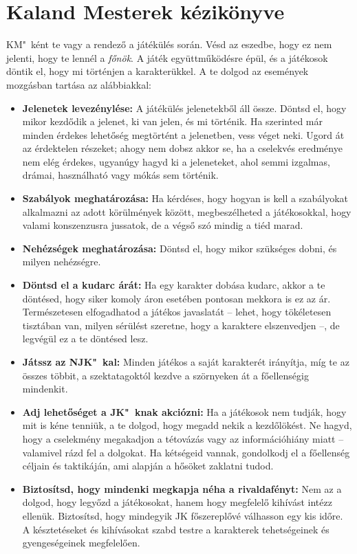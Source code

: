 \chapter{Kaland Mesterek kézikönyve}

KM"~ként te vagy a rendező a játékülés során. Vésd az eszedbe, hogy ez nem jelenti, hogy te lennél a \emph{főnök}. A  játék együttműködésre épül, és a játékosok döntik el, hogy mi történjen a karakterükkel. A te dolgod az események mozgásban tartása az alábbiakkal:

\begin{itemize}
    \item \textbf{Jelenetek levezénylése:} A játékülés jelenetekből áll össze. Döntsd el, hogy mikor kezdődik a jelenet, ki van jelen, és mi történik. Ha szerinted már minden érdekes lehetőség megtörtént a jelenetben, vess véget neki. Ugord át az érdektelen részeket; ahogy nem dobsz akkor se, ha a cselekvés eredménye nem elég érdekes, ugyanúgy hagyd ki a jeleneteket, ahol semmi izgalmas, drámai, használható vagy mókás sem történik.
    \item \textbf{Szabályok meghatározása:} Ha kérdéses, hogy hogyan is kell a szabályokat alkalmazni az adott körülmények között, megbeszélheted a játékosokkal, hogy valami konszenzusra jussatok, de a végső szó mindig a tiéd marad.
    \item \textbf{Nehézségek meghatározása:} Döntsd el, hogy mikor szükséges dobni, és milyen nehézségre.
    \item \textbf{Döntsd el a kudarc árát:} Ha egy karakter dobása kudarc, akkor a te döntésed, hogy siker komoly áron esetében pontosan mekkora is ez az ár. Természetesen elfogadhatod a játékos javaslatát – lehet, hogy tökéletesen tisztában van, milyen sérülést szeretne, hogy a karaktere elszenvedjen –, de legvégül ez a te döntésed lesz.
    \item \textbf{Játssz az NJK"~kal:} Minden játékos a saját karakterét irányítja, míg te az összes többit, a szektatagoktól kezdve a szörnyeken át a főellenségig mindenkit.
    \item \textbf{Adj lehetőséget a JK"~knak akciózni:} Ha a játékosok nem tudják, hogy mit is kéne tenniük, a te dolgod, hogy megadd nekik a kezdőlökést. Ne hagyd, hogy a cselekmény megakadjon a tétovázás vagy az információhiány miatt – valamivel rázd fel a dolgokat. Ha kétségeid vannak, gondolkodj el a főellenség  céljain és taktikáján, ami alapján a hősöket zaklatni tudod.
    \item \textbf{Biztosítsd, hogy mindenki megkapja néha a rivaldafényt:} Nem az a dolgod, hogy legyőzd a játékosokat, hanem hogy megfelelő kihívást intézz ellenük. Biztosítsd, hogy mindegyik JK főszereplővé válhasson egy kis időre. A késztetéseket és kihívásokat szabd testre a karakterek tehetségeinek és gyengeségeinek megfelelően.

\end{itemize}
